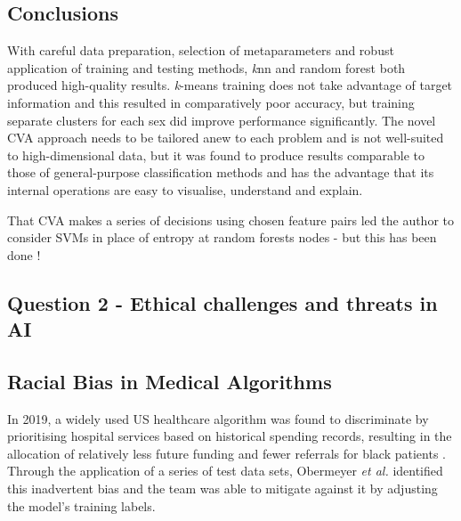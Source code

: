\documentclass[a4paper, 11pt]{article}
\begin{document}
\vspace{\baselineskip}

\subsection*{Conclusions}

With careful data preparation, selection of metaparameters and robust application of training and testing methods, 
\textit{k}nn and random forest both produced high-quality results. 
\textit{k}-means training does not take advantage of target information and this resulted in comparatively poor accuracy, but training
separate clusters for each sex did improve performance significantly.
The novel CVA approach needs to be tailored anew to each problem and is not well-suited to high-dimensional data, 
but it was found to produce results comparable to those of general-purpose classification methods and has the advantage that 
its internal operations are easy to visualise, understand and explain.

That CVA makes a series of decisions using chosen feature pairs 
led the author to consider SVMs in place of entropy at random forests nodes - 
but this has been done \cite{law2003support}!

\vspace{-0.1\baselineskip} %
\begin{center}
\subsection*{Question 2 - Ethical challenges and threats in AI}
\end{center}
\vspace{0.1\baselineskip} %
\subsection*{Racial Bias in Medical Algorithms}

In 2019, a widely used US healthcare algorithm was found to discriminate by prioritising hospital services 
based on historical spending records, resulting in the allocation of relatively less future funding and fewer referrals 
for black patients \cite{Jemielity2019, Ledford2019}. 
Through the application of a series of test data sets, Obermeyer \textit{et al.} \cite{Obermeyer2019} identified this inadvertent bias 
and the team was able to mitigate against it by adjusting the model’s training labels. 
\end{document}
